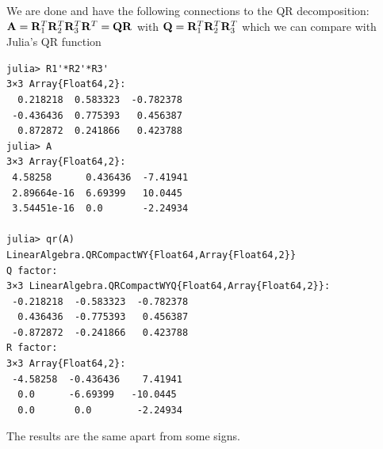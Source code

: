 We are done and have the following connections to the QR decomposition: $\mathbf{A} = \mathbf{R}_1^T \mathbf{R}_2^T \mathbf{R}_3^T \mathbf{R}^T = \mathbf{Q} \mathbf{R}$ with $\mathbf{Q} = \mathbf{R}_1^T \mathbf{R}_2^T \mathbf{R}_3^T$ which we can compare with Julia's QR function

\begin{verbatim}
julia> R1'*R2'*R3'
3×3 Array{Float64,2}:
  0.218218  0.583323  -0.782378
 -0.436436  0.775393   0.456387
  0.872872  0.241866   0.423788
julia> A
3×3 Array{Float64,2}:
 4.58258      0.436436  -7.41941
 2.89664e-16  6.69399   10.0445 
 3.54451e-16  0.0       -2.24934

julia> qr(A)
LinearAlgebra.QRCompactWY{Float64,Array{Float64,2}}
Q factor:
3×3 LinearAlgebra.QRCompactWYQ{Float64,Array{Float64,2}}:
 -0.218218  -0.583323  -0.782378
  0.436436  -0.775393   0.456387
 -0.872872  -0.241866   0.423788
R factor:
3×3 Array{Float64,2}:
 -4.58258  -0.436436    7.41941
  0.0      -6.69399   -10.0445 
  0.0       0.0        -2.24934
\end{verbatim}

The results are the same apart from some signs.


